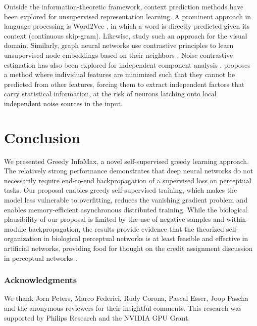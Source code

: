\documentclass{article}
\begin{document}
Outside the information-theoretic framework, context prediction methods have been explored for unsupervised representation learning. A prominent approach in language processing is Word2Vec \citep{Mikolov2013-zv}, in which a word is directly predicted given its context (continuous skip-gram). Likewise, \cite{Doersch2015-ku} study such an approach for the visual domain. Similarly, graph neural networks use contrastive principles to learn unsupervised node embeddings based on their neighbors \citep{Nickel2011-ri,Perozzi2014-tb,Nickel2015-ja,Kipf2016-ha,Velickovic2018-cb}. Noise contrastive estimation has also been explored for independent component analysis \citep{Hyvarinen2018-jp, hyvarinen2016unsupervised, Hyvarinen2017-td}. \cite{Schmidhuber1992-dx} proposes a method where individual features are minimized such that they cannot be predicted from other features, forcing them to extract independent factors that carry statistical information, at the risk of neurons latching onto local independent noise sources in the input.




 

\section{Conclusion}
We presented Greedy InfoMax, a novel self-supervised greedy learning approach. The relatively strong performance demonstrates that deep neural networks do not necessarily require end-to-end backpropagation of a supervised loss on perceptual tasks. Our proposal enables greedy self-supervised training, which makes the model less vulnerable to overfitting, reduces the vanishing gradient problem and enables memory-efficient asynchronous distributed training. While the biological plausibility of our proposal is limited by the use of negative samples and within-module backpropagation, the results provide evidence that the theorized self-organization in biological perceptual networks is at least feasible and effective in artificial networks, providing food for thought on the credit assignment discussion in perceptual networks \citep{bengio2015towards,linsker1988self}.











 
\subsubsection*{Acknowledgments}
We thank Jorn Peters, Marco Federici, Rudy Corona, Pascal Esser, Joop Pascha and the anonymous reviewers for their insightful comments. This research was supported by Philips Research and the NVIDIA GPU Grant.
\end{document}
